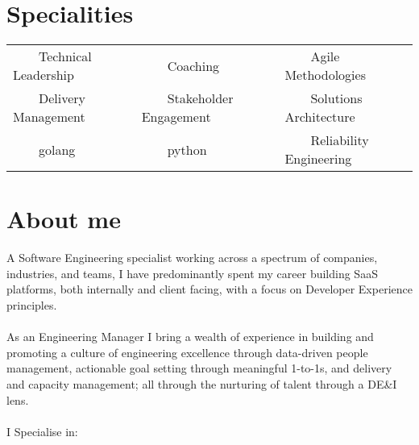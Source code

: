 \documentclass[11pt,a4paper,sans]{article}
\newcommand{\tabitem}{~~\llap{\textbullet}~~}
\begin{document}
\newcommand{\job}{Engineering Manager}


\section{Specialities}
\begin{tabular}{lll}
  \tabitem Technical Leadership & \tabitem Coaching & \tabitem Agile Methodologies \\
  \tabitem Delivery Management & \tabitem Stakeholder Engagement & \tabitem Solutions Architecture \\
  \tabitem golang & \tabitem python & \tabitem Reliability Engineering \\

\end{tabular}

\section{About me}
A Software Engineering specialist working across a spectrum of companies, industries, and teams, I have predominantly spent my career building SaaS platforms, both internally and client facing, with a focus on Developer Experience principles. \\
\\
As an Engineering Manager I bring a wealth of experience in building and promoting a culture of engineering excellence through data-driven people management, actionable goal setting through meaningful 1-to-1s, and delivery and capacity management; all through the nurturing of talent through a DE\&I lens.\\
\\
I Specialise in:
\end{document}
